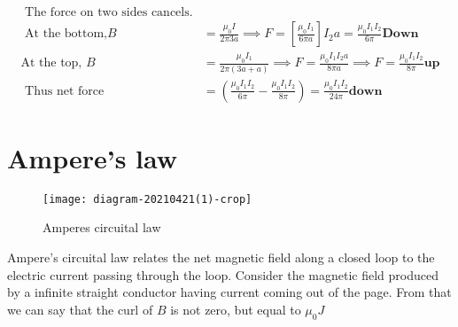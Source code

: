 \begin{answer}
	\begin{align*}
\text{	The force on two sides cancels.}\\
\text{	At the bottom,}B&=\frac{\mu_{0} I}{2\pi 3a} \implies F=\left[ \frac{\mu_{0} I_1}{6\pi a}\right] 	I_2a=\frac{\mu_{0} I_1I_2}{6\pi} \textbf{Down}\\
	\text{At the top, }B&=\frac{\mu_{0}I_1}{2\pi(3a+a)}\implies F=\frac{\mu_{0}I_1I_2a}{8\pi a}\implies F=\frac{\mu_{0}I_1I_2}{8\pi} \textbf{up}\\
\text{	Thus net force}&=\left( \frac{\mu_{0}I_1I_2}{6\pi}-\frac{\mu_{0}I_1I_2}{8\pi}\right) =\frac{\mu_{0}I_1I_2}{24\pi}\textbf{down}
	\end{align*}
\end{answer}
\section{Ampere's law}
 \begin{wrapfigure}{r}{0.35\textwidth}
	\begin{center}
		\texttt{[image: diagram-20210421(1)-crop]}
	\end{center}
	\caption{Amperes circuital law}
\end{wrapfigure}
Ampere's circuital law relates the net magnetic field along a closed loop to the electric current passing through the loop.
Consider the magnetic field produced by a infinite straight conductor having current coming out of the page. From that we can say that the curl of $B$ is not zero, but equal to $\mu_0J$

